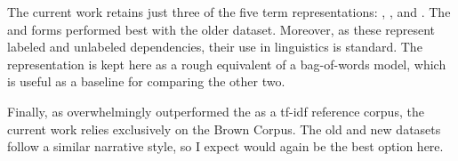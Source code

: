 The current work retains just three of the five term representations: , , and . The  and  forms performed best with the older dataset. Moreover, as these represent labeled and unlabeled dependencies, their use in linguistics is standard. The  representation is kept here as a rough equivalent of a bag-of-words model, which is useful as a baseline for comparing the other two.

Finally, as  overwhelmingly outperformed the  as a tf-idf reference corpus, the current work relies exclusively on the Brown Corpus. The old and new datasets follow a similar narrative style, so I expect  would again be the best option here.

%
